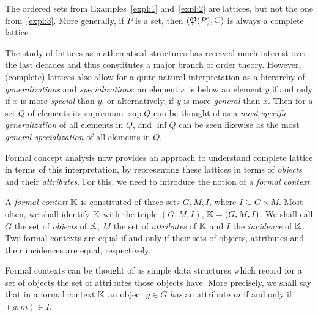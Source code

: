 The ordered sets from Examples~\ref{expl:1} and~\ref{expl:2} are lattices, but not the one
from~\ref{expl:3}.  More generally, if $P$ is a set, then $({\mathfrak{P}(P)}, \subseteq)$ is
always a complete lattice.

The study of lattices as mathematical structures has received much interest over the last
decades and thus constitutes a major branch of order theory. However, (complete) lattices also allow for a quite natural
interpretation as a hierarchy of \emph{generalizations} and \emph{specializations}: an
element $x$ is below an element $y$ if and only if $x$ is more \emph{special} than $y$, or
alternatively, if $y$ is more \emph{general} than $x$.  Then for a set $Q$ of elements its
supremum $\sup Q$ can be thought of as a \emph{most-specific generalization} of all
elements in $Q$, and $\inf Q$ can be seen likewise as the most \emph{general
  specialization} of all elements in $Q$.

Formal concept analysis now provides an approach to understand complete lattice in terms
of this interpretation, by representing these lattices in terms of \emph{objects} and
their \emph{attributes}.  For this, we need to introduce the notion of a \emph{formal
  context}.

\begin{Definition}
  \label{def:formal-context}
  A \emph{formal context} ${\mathbb{K}}$ is constituted of three sets $G, M, I$, where $I
  \subseteq G \times M$.  Most often, we shall identify ${\mathbb{K}}$ with the triple $(G, M,
  I)$, \ie ${\mathbb{K}} = (G, M, I)$.  We shall call $G$ the set of \emph{objects} of ${\mathbb{K}}$,
  $M$ the set of \emph{attributes} of ${\mathbb{K}}$ and $I$ the \emph{incidence} of ${\mathbb{K}}$.
  Two formal contexts are equal if and only if their sets of objects, attributes and their
  incidences are equal, respectively.
\end{Definition}

Formal contexts can be thought of as simple data structures which record for a set of
objects the set of attributes those objects have.  More precisely, we shall say that in a
formal context ${\mathbb{K}}$ an object $g \in G$ \emph{has} an attribute $m$ if and only if
$(g, m) \in I$.

